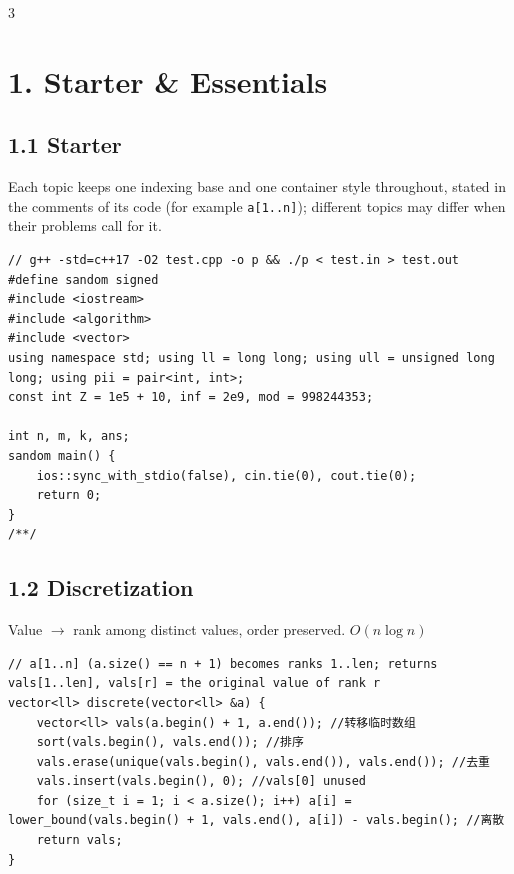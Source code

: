 \documentclass[8pt]{extarticle}
\begin{document}
\begin{multicols*}{3}
\tableofcontents
\section*{1. Starter \& Essentials}

\subsection*{1.1 Starter}

Each topic keeps one indexing base and one container style throughout, stated in the comments of its code (for example \texttt{a[1..n]}); different topics may differ when their problems call for it.

\begin{lstlisting}
// g++ -std=c++17 -O2 test.cpp -o p && ./p < test.in > test.out
#define sandom signed
#include <iostream>
#include <algorithm>
#include <vector>
using namespace std; using ll = long long; using ull = unsigned long long; using pii = pair<int, int>;
const int Z = 1e5 + 10, inf = 2e9, mod = 998244353;

int n, m, k, ans;
sandom main() {
    ios::sync_with_stdio(false), cin.tie(0), cout.tie(0);
    return 0;
}
/**/
\end{lstlisting}

\subsection*{1.2 Discretization}

Value $\to$ rank among distinct values, order preserved. $O(n \log n)$

\begin{lstlisting}
// a[1..n] (a.size() == n + 1) becomes ranks 1..len; returns vals[1..len], vals[r] = the original value of rank r
vector<ll> discrete(vector<ll> &a) {
    vector<ll> vals(a.begin() + 1, a.end()); //转移临时数组
    sort(vals.begin(), vals.end()); //排序
    vals.erase(unique(vals.begin(), vals.end()), vals.end()); //去重
    vals.insert(vals.begin(), 0); //vals[0] unused
    for (size_t i = 1; i < a.size(); i++) a[i] = lower_bound(vals.begin() + 1, vals.end(), a[i]) - vals.begin(); //离散
    return vals;
}
\end{lstlisting}


\end{multicols*}
\end{document}
